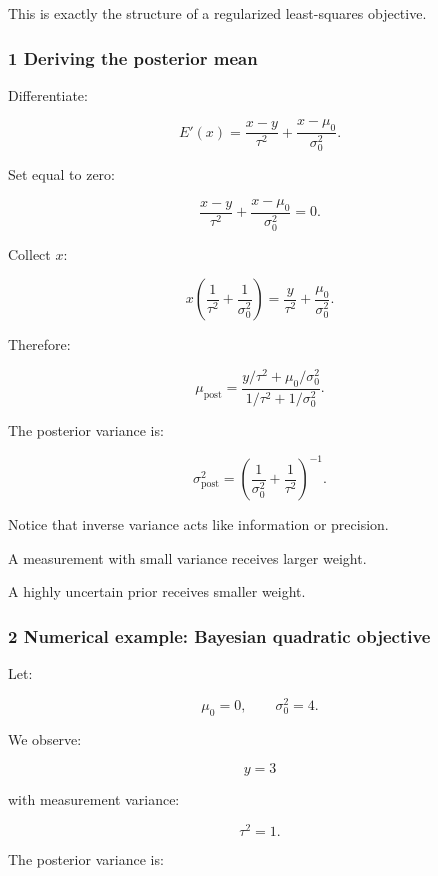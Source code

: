 This is exactly the structure of a regularized least-squares objective.

\subsubsection{1 Deriving the posterior mean}\label{02-foundations-ii-ch031-deriving-the-posterior-mean}

\hypertarget{02-foundations-ii-ch031-deriving-the-posterior-mean}{}

Differentiate:

\[
 E'(x)= \frac{x-y}{\tau^2} + \frac{x-\mu_0}{\sigma_0^2}.
\]

Set equal to zero:

\[
 \frac{x-y}{\tau^2} + \frac{x-\mu_0}{\sigma_0^2} =0.
\]

Collect \(x\):

\[
 x\left( \frac1{\tau^2} +\frac1{\sigma_0^2} \right) = \frac y{\tau^2} +\frac{\mu_0}{\sigma_0^2}.
\]

Therefore:

\[
 \boxed{ \mu_{\mathrm{post}} = \frac{ y/\tau^2+\mu_0/\sigma_0^2 }{ 1/\tau^2+1/\sigma_0^2 } }.
\]

The posterior variance is:

\[
 \boxed{ \sigma_{\mathrm{post}}^2 = \left( \frac1{\sigma_0^2} +\frac1{\tau^2} \right)^{-1} }.
\]

Notice that inverse variance acts like information or precision.

A measurement with small variance receives larger weight.

A highly uncertain prior receives smaller weight.

\subsubsection{2 Numerical example: Bayesian quadratic objective}\label{02-foundations-ii-ch031-numerical-example-bayesian-quadratic-objective}

\hypertarget{02-foundations-ii-ch031-numerical-example-bayesian-quadratic-objective}{}

Let:

\[
 \mu_0=0,\qquad \sigma_0^2=4.
\]

We observe:

\[
 y=3
\]

with measurement variance:

\[
 \tau^2=1.
\]

The posterior variance is:


